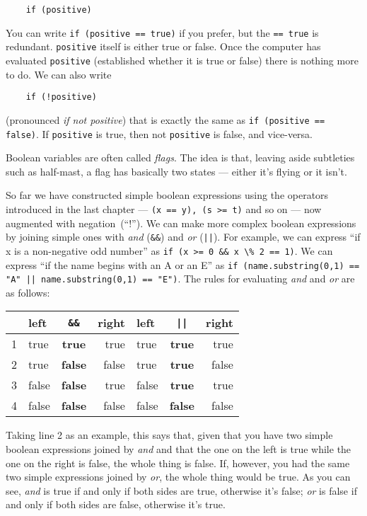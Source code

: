 \begin{Verbatim}
    if (positive)
\end{Verbatim}

You can write \texttt{if (positive == true)} if you prefer, but the
\texttt{== true} 
is redundant.  \texttt{positive} itself is either true or false.  Once the
computer has evaluated \texttt{positive} (established whether it is true or
false) there is nothing more to do.  We can also write

\begin{Verbatim}
    if (!positive)
\end{Verbatim}

(pronounced \emph{if not positive}) that is exactly the same as \texttt{if
  (positive == false)}. If \texttt{positive} is true, then not
\texttt{positive} is false, and vice-versa. 

Boolean variables are often called \emph{flags}.  The idea is that,
leaving aside subtleties such as half-mast, a flag has basically two states
--- either it's flying or it isn't.

So far we have constructed simple boolean expressions using the operators
introduced in the last chapter --- \texttt{(x == y), (s >= t)} and so on ---
now augmented with negation~(``!'').
We can make more complex boolean expressions by joining simple ones
with \emph{and} (\verb!&&!) and \emph{or} (\texttt{||}).  For example,
we can express ``if x is a non-negative odd number'' as
\verb+if (x >= 0 && x \% 2 == 1)+. We can express ``if the name begins
with an A or an E'' as \texttt{if (name.substring(0,1) == "A" ||
  name.substring(0,1) == "E")}.  The rules for evaluating \emph{and}
and \emph{or} are as follows:

\vspace{1em}
\begin{tabular}{|l|lcr||lcr|}
\hline
& left & \verb!&&! & right & left & \verb+||+ & right\\
\hline
\hline
1 & true & \textbf{true} & true&true&\textbf{true}&true\\
2 & true & \textbf{false} & false&true&\textbf{true}&false\\
3 & false & \textbf{false} & true&false&\textbf{true}&true\\
4 & false & \textbf{false} & false&false&\textbf{false}&false\\
\hline
\end{tabular}
\vspace{1em}

Taking line 2 as an example, this says that, given that you have two simple
boolean expressions joined by \emph{and} and that the one on the left is
true while the one on the right is false, the whole thing is false.  If,
however, you had the same two simple expressions joined by \emph{or}, the
whole thing would be true. As you can see, \emph{and} is true if and
only if both sides are true, otherwise it's false; \emph{or} is false
if and only if both sides are false, otherwise it's true.

